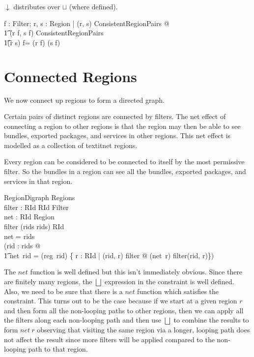 \documentclass[a4paper,9pt,twoside]{article}
\begin{document}
$\downarrow$ distributes over $\sqcup$ (where defined).
\begin{argue}
  \shows \forall f : Filter; r, s : Region | (r, s) \in ConsistentRegionPairs @ \\
\t1 (r \downarrow f, s \downarrow f) \in ConsistentRegionPairs \land \\
\t1(r \sqcup s) \downarrow f= (r \downarrow f) \sqcup (s \downarrow f) \\
\end{argue}

\clearpage
\section{Connected Regions}
\label{cha:connregions}

We now connect up regions to form a directed graph.

Certain pairs of distinct regions are connected by filters. The net effect of connecting a region to other
regions is that the region may then be able to see bundles, exported packages, and services in other regions.
This net effect is modelled as a collection of textit{net} regions.

Every region can be considered to be connected to itself by the most permissive filter.
So the bundles in a region can see all the bundles, exported packages, and services in that region.
\begin{schema}{RegionDigraph}
  Regions \\
  filter : RId \cross RId \pfun Filter \\
  net : RId \pfun Region \\
\where
  \dom filter \subseteq (rids \cross rids) \setminus \id RId \\
  \dom net = rids \\
  (\forall rid : rids @ \\
\t1 net~rid = (reg~rid) \sqcup \bigsqcup \{ r : RId | (rid, r) \in \dom filter @ (net~r) \downarrow filter(rid, r)\})\\
\end{schema}

The $net$ function is well defined but this isn't immediately obvious.
Since there are finitely many regions, the $\bigsqcup$ expression in the constraint is well defined.
Also, we need to be sure that there is a $net$ function which satisfies the constraint.
This turns out to be the case because if we start at a given region $r$ and then form all the non-looping
paths to other regions, then we can apply all the filters along each non-looping path and then
use $\bigsqcup$ to combine the results to form $net~r$ observing that visiting the same region via
a longer, looping path does not affect the result since more filters will
be applied compared to the non-looping path to that region.
\end{document}
